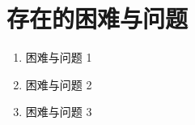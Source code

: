 \chapter{存在的困难与问题}

\begin{enumerate}
    \item 困难与问题 1
    \item 困难与问题 2
    \item 困难与问题 3
\end{enumerate}
